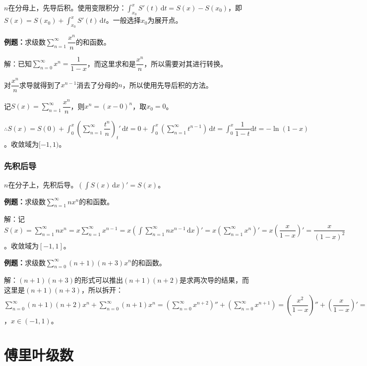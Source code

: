 \documentclass[UTF8, 12pt]{ctexart}
\begin{document}
$n$在分母上，先导后积。使用变限积分：$\int_{x_0}^xS'(t)\,\textrm{d}t=S(x)-S(x_0)$，即$S(x)=S(x_0)+\int_{x_0}^xS'(t)\,\textrm{d}t$。一般选择$x_0$为展开点。

\textbf{例题：}求级数$\sum\limits_{n=1}^\infty\dfrac{x^n}{n}$的和函数。

解：已知$\sum\limits_{n=0}^\infty x^n=\dfrac{1}{1-x}$，而这里求和是$\dfrac{x^n}{n}$，所以需要对其进行转换。

对$\dfrac{x^n}{n}$求导就得到了$x^{n-1}$消去了分母的$n$，所以使用先导后积的方法。

记$S(x)=\sum\limits_{n=1}^\infty\dfrac{x^n}{n}$，则$x^n=(x-0)^n$，取$x_0=0$。

$\therefore S(x)=S(0)+\displaystyle{\int_0^x\left(\sum\limits_{n=1}^\infty\dfrac{t^n}{n}\right)_t'\,\textrm{d}t}=0+\int_0^x(\sum\limits_{n=1}^\infty t^{n-1})\,\textrm{d}t=\displaystyle{\int_0^x\dfrac{1}{1-t}\textrm{d}t}=-\ln(1-x)$。收敛域为$[-1,1)$。

\subsubsection{先积后导}

$n$在分子上，先积后导。$(\int S(x)\,\textrm{d}x)'=S(x)$。

\textbf{例题：}求级数$\sum\limits_{n=1}^\infty nx^n$的和函数。

解：记$S(x)=\sum\limits_{n=1}^\infty nx^n=x\sum\limits_{n=1}^\infty x^{n-1}=x(\int\sum\limits_{n=1}^\infty nx^{n-1}\,\textrm{d}x)'=x(\sum\limits_{n=1}^\infty x^n)'=x\left(\dfrac{x}{1-x}\right)'=\dfrac{x}{(1-x)^2}$。收敛域为$[-1,1]$。

\textbf{例题：}求级数$\sum\limits_{n=0}^\infty(n+1)(n+3)x^n$的和函数。

解：$(n+1)(n+3)$的形式可以推出$(n+1)(n+2)$是求两次导的结果，而这里是$(n+1)(n+3)$，所以拆开：$\sum\limits_{n=0}^\infty(n+1)(n+2)x^n+\sum\limits_{n=0}^\infty(n+1)x^n=\left(\sum\limits_{n=0}^\infty x^{n+2}\right)''+\left(\sum\limits_{n=0}^\infty x^{n+1}\right)=\left(\dfrac{x^2}{1-x}\right)''+\left(\dfrac{x}{1-x}\right)'=\dfrac{3-x}{(1-x)^3}$，$x\in(-1,1)$。

\section{傅里叶级数}
\end{document}

